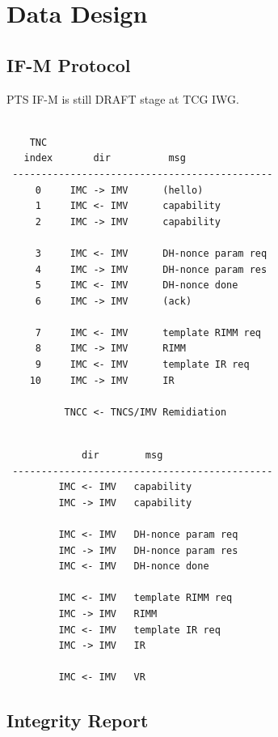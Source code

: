 \documentclass[12pt,a4paper]{article}
\begin{document}
\section{Data Design}

\subsection{IF-M Protocol}

PTS IF-M is still DRAFT stage at TCG IWG.


\begin{lstlisting}[label=ifmptnc, caption=IF-M protocol (TNC)]

    TNC
   index       dir          msg
 ---------------------------------------------
     0     IMC -> IMV      (hello)
     1     IMC <- IMV      capability 
     2     IMC -> IMV      capability
 
     3     IMC <- IMV      DH-nonce param req
     4     IMC -> IMV      DH-nonce param res
     5     IMC <- IMV      DH-nonce done
     6     IMC -> IMV      (ack)
 
     7     IMC <- IMV      template RIMM req
     8     IMC -> IMV      RIMM
     9     IMC <- IMV      template IR req
    10     IMC -> IMV      IR

          TNCC <- TNCS/IMV Remidiation
\end{lstlisting}


\begin{lstlisting}[label=ifmptnc, caption=IF-M protocol (standalone)]

             dir        msg
 ---------------------------------------------
         IMC <- IMV   capability 
         IMC -> IMV   capability
 
         IMC <- IMV   DH-nonce param req
         IMC -> IMV   DH-nonce param res
         IMC <- IMV   DH-nonce done
 
         IMC <- IMV   template RIMM req
         IMC -> IMV   RIMM
         IMC <- IMV   template IR req
         IMC -> IMV   IR

         IMC <- IMV   VR
\end{lstlisting}


\subsection{Integrity Report}
\end{document}
